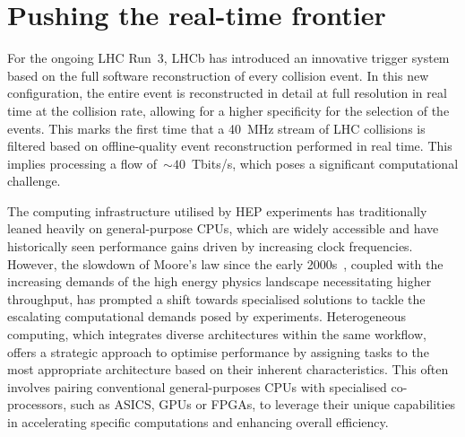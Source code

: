 


\section{Pushing the real-time frontier}
For the ongoing LHC Run~3, LHCb has introduced an innovative trigger system based on the full software reconstruction of every collision event. In this new configuration, the entire event is reconstructed in detail at full resolution in real time at the collision rate, allowing for a higher specificity for the selection of the events. This marks the first time that a \SI{40}{\mega\hertz} stream of LHC collisions is filtered based on offline-quality event reconstruction performed in real time. This implies processing a flow of~$\sim 40$~Tbits/s, which poses a significant computational challenge. 

The computing infrastructure utilised by HEP experiments has traditionally leaned heavily on general-purpose CPUs, which are widely accessible and have historically seen performance gains driven by increasing clock frequencies. However, the slowdown of Moore's law since the early 2000s~\cite{Tuomi_2002}, coupled with the increasing demands of the high energy physics landscape necessitating higher throughput, has prompted a shift towards specialised solutions to tackle the escalating computational demands posed by experiments. Heterogeneous computing, which integrates diverse architectures within the same workflow, offers a strategic approach to optimise performance by assigning tasks to the most appropriate architecture based on their inherent characteristics. This often involves pairing conventional general-purposes CPUs with specialised co-processors, such as ASICS, GPUs or FPGAs, to leverage their unique capabilities in accelerating specific computations and enhancing overall efficiency.

